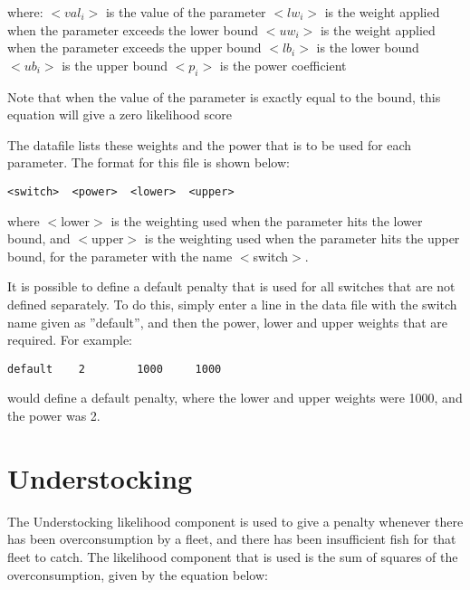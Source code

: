 \documentclass [a4paper, 10pt]{book}
\begin{document}
where:\newline
$<val_i>$ is the value of the parameter\newline
$<lw_i>$ is the weight applied when the parameter exceeds the lower bound\newline
$<uw_i>$ is the weight applied when the parameter exceeds the upper bound\newline
$<lb_i>$ is the lower bound\newline
$<ub_i>$ is the upper bound\newline
$<p_i>$ is the power coefficient\newline

Note that when the value of the parameter is exactly equal to the bound, this equation will give a zero likelihood score

\bigskip
The datafile lists these weights and the power that is to be used for each parameter.  The format for this file is shown below:

{\small\begin{verbatim}
<switch>  <power>  <lower>  <upper>
\end{verbatim}}

where $<$lower$>$ is the weighting used when the parameter hits the lower bound, and $<$upper$>$ is the weighting used when the parameter hits the upper bound, for the parameter with the name $<$switch$>$.

\bigskip
It is possible to define a default penalty that is used for all switches that are not defined separately.  To do this, simply enter a line in the data file with the switch name given as ''default'', and then the power, lower and upper weights that are required.  For example:

{\small\begin{verbatim}
default    2        1000     1000
\end{verbatim}}

would define a default penalty, where the lower and upper weights were 1000, and the power was 2.

\section{Understocking}\label{sec:understocking}
The Understocking likelihood component is used to give a penalty whenever there has been overconsumption by a fleet, and there has been insufficient fish for that fleet to catch.  The likelihood component that is used is the sum of squares of the overconsumption, given by the equation below:
\end{document}
